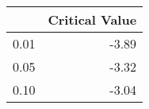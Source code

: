 \begin{tabular}{lr}
\toprule
{} &  Critical Value \\
\midrule
0.01 &           -3.89 \\
0.05 &           -3.32 \\
0.10 &           -3.04 \\
\bottomrule
\end{tabular}
